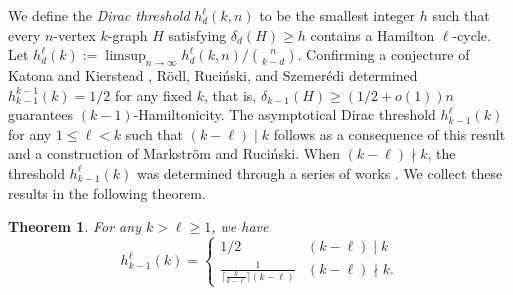 \documentclass[11pt, reqno]{amsart}    	%
\newtheorem{thm}{Theorem}[section]
\theoremstyle{definition}
\numberwithin{equation}{section}
\begin{document}
	We define the \emph{Dirac threshold} $ h_{d}^{\ell}(k,n) $ to be the smallest integer $ h $ such that every	$ n $-vertex $ k $-graph $ H $ satisfying $ \delta_{d}(H)\ge h $ contains a Hamilton $ \ell $-cycle. Let $ h_{d}^{\ell}(k):=\limsup_{n\to \infty}h_{d}^{\ell}(k,n)/\binom{n}{k-d} $. 
	Confirming a conjecture of Katona and Kierstead \cite{2006Hamiltonian},  R\"odl, Ruci\'nski, and Szemer\'edi \cite{2008An,VOJTECH2006A} determined $ h_{k-1}^{k-1}(k) =1/2$ for any fixed $ k $, that is, $\delta_{k-1}(H)\ge (1/2+o(1))n$ guarantees $(k-1)$-Hamiltonicity. 
	The asymptotical Dirac threshold $ h_{k-1}^{\ell}(k)$ for any $ 1 \le \ell < k $ such that $(k-\ell)\mid k$ follows as a consequence of this result and a construction of Markstr\"om and Ruci\'nski. 
	When $(k-\ell)\nmid k$, the threshold $ h_{k-1}^{\ell}(k) $ was determined through a series of works  \cite{Daniela2006Loose, 2010Loose, Hi2010Dirac, Daniela2010Hamilton}.
	We collect these results in the following theorem.
	
	\begin{thm}\cite{Hi2010Dirac,2010Loose,Daniela2010Hamilton,VOJTECH2006A,2008An} 
		For any $k> \ell \ge 1$, we have	
		\[h_{k-1}^\ell(k)= 
		\begin{cases}
			1/2 & {(k-\ell) \mid k}\\
			\frac{1}{\lceil \frac{k}{k-\ell}\rceil (k-\ell)} & {(k-\ell) \nmid k}.
		\end{cases}
		\]
	\end{thm}
	
\end{document}

